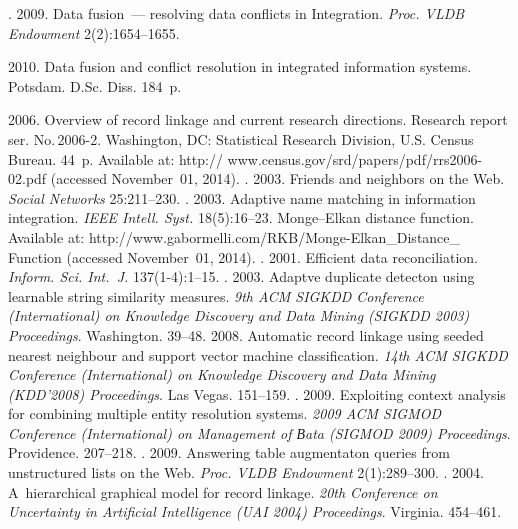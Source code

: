 \begin{multicols}{2}
{{\begin{thebibliography}{99}
. 2009. Data fusion~---
resolving data conflicts in Integration.
\textit{Proc. VLDB Endowment} 2(2):1654--1655.

 2010. Data fusion and conflict resolution in integrated
information systems.  Potsdam. D.Sc. Diss. 184~p.


 2006.
Overview of record linkage and current research directions.
 Research report ser. No.\,2006-2.
Washington, DC: Statistical Research Division, U.S. Census Bureau. 44~p. Available at:
{\sf http:// www.census.gov/srd/papers/pdf/rrs2006-02.pdf} (accessed November~01, 2014).
. 2003. Friends and neighbors on the Web.
\textit{Social Networks} 25:211--230.
.
2003. Adaptive name matching in information integration.
\textit{IEEE Intell. Syst.} 18(5):16--23.
Monge--Elkan distance function. Available at:
{\sf http://\linebreak www.gabormelli.com/RKB/Monge-Elkan\_Distance\_ Function}
(accessed November~01, 2014).
.
2001. Efficient data reconciliation.
\textit{Inform. Sci. Int.~J.} 137(1-4):1--15.
. 2003.
Adaptve duplicate detecton using learnable string similarity measures.
\textit{9th ACM SIGKDD  Conference (International) on Knowledge Discovery and
Data Mining (SIGKDD 2003) Proceedings}. Washington. 39--48.
 2008. Automatic record linkage using seeded nearest
neighbour and support vector machine classification.
\textit{14th ACM SIGKDD  Conference (International) on Knowledge Discovery and
Data Mining (KDD'2008) Proceedings}. Las Vegas. 151--159.
. 2009.
Exploiting context analysis for combining multiple entity resolution systems.
\textit{2009 ACM SIGMOD  Conference (International) on Management of Вata (SIGMOD 2009)
Proceedings}. Providence. 207--218.
. 2009.
Answering table augmentaton queries from unstructured lists on the Web.
\textit{Proc. VLDB Endowment} 2(1):289--300.
. 2004. A~hierarchical
graphical model for record linkage. \textit{20th Conference on Uncertainty in
Artificial Intelligence (UAI 2004) Proceedings}.  Virginia. 454--461.


\end{thebibliography}}}
\end{multicols}
